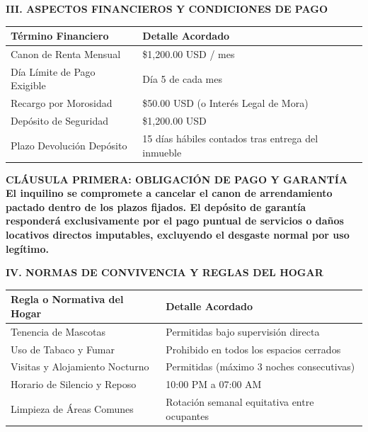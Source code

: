 \documentclass[11pt,letterpaper]{article}
\newcommand{\CanonRenta}{\$1,200.00 USD / mes}
\newcommand{\DiaLimitePago}{Día 5 de cada mes}
\newcommand{\RecargoMora}{\$50.00 USD (o Interés Legal de Mora)}
\newcommand{\DepositoGarantia}{\$1,200.00 USD}
\newcommand{\PlazoDevolucionDeposito}{15 días hábiles contados tras entrega del inmueble}
\newcommand{\ReglaMascotas}{Permitidas bajo supervisión directa}
\newcommand{\ReglaFumar}{Prohibido en todos los espacios cerrados}
\newcommand{\ReglaVisitas}{Permitidas (máximo 3 noches consecutivas)}
\newcommand{\HorarioSilencio}{10:00 PM a 07:00 AM}
\newcommand{\ProgramaLimpieza}{Rotación semanal equitativa entre ocupantes}
\begin{document}
{\large\bfseries\color{darkslate} III. ASPECTOS FINANCIEROS Y CONDICIONES DE PAGO}

\renewcommand{\arraystretch}{1.35}
\begin{tabular}{p{} p{}}
    \hline
    \textbf{Término Financiero} & \textbf{Detalle Acordado} \\
    \hline
    Canon de Renta Mensual & \CanonRenta \\
    Día Límite de Pago Exigible & \DiaLimitePago \\
    Recargo por Morosidad & \RecargoMora \\
    Depósito de Seguridad & \DepositoGarantia \\
    Plazo Devolución Depósito & \PlazoDevolucionDeposito \\
    \hline
\end{tabular}

\vspace{0.8em}

\begin{tcolorbox}[colback=lightbg, colframe=brandteal, boxrule=1pt, arc=4pt, left=8pt, right=8pt, top=6pt, bottom=6pt]
    \small\bfseries\color{darkslate} CLÁUSULA PRIMERA: OBLIGACIÓN DE PAGO Y GARANTÍA\\[3pt]
    \small\color{bodytext}
    El inquilino se compromete a cancelar el canon de arrendamiento pactado dentro de los plazos fijados. El depósito de garantía responderá exclusivamente por el pago puntual de servicios o daños locativos directos imputables, excluyendo el desgaste normal por uso legítimo.
\end{tcolorbox}

\vspace{0.8em}

{\large\bfseries\color{darkslate} IV. NORMAS DE CONVIVENCIA Y REGLAS DEL HOGAR}

\renewcommand{\arraystretch}{1.35}
\begin{tabular}{p{} p{}}
    \hline
    \textbf{Regla o Normativa del Hogar} & \textbf{Detalle Acordado} \\
    \hline
    Tenencia de Mascotas & \ReglaMascotas \\
    Uso de Tabaco y Fumar & \ReglaFumar \\
    Visitas y Alojamiento Nocturno & \ReglaVisitas \\
    Horario de Silencio y Reposo & \HorarioSilencio \\
    Limpieza de Áreas Comunes & \ProgramaLimpieza \\
    \hline
\end{tabular}
\end{document}
